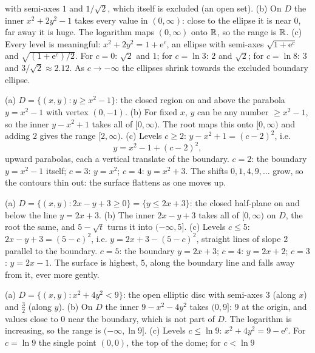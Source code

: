 \begin{solutions}
        with semi-axes $1$ and $1/\sqrt2$, which itself is excluded (an
        open set).
        (b) On $D$ the inner $x^{2}+2y^{2}-1$ takes every value in
        $(0,\infty)$: close to the ellipse it is near $0$, far away it is
        huge. The logarithm maps $(0,\infty)$ onto $\mathbb{R}$, so the range is
        $\mathbb{R}$.
        (c) Every level is meaningful:
        $x^{2}+2y^{2}=1+\mathrm{e}^{c}$, an ellipse with semi-axes
        $\sqrt{1+\mathrm{e}^{c}}$ and $\sqrt{(1+\mathrm{e}^{c})/2}$. For
        $c=0$: $\sqrt2$ and $1$; for $c=\ln3$: $2$ and $\sqrt2$; for
        $c=\ln8$: $3$ and $3/\sqrt2\approx2.12$. As $c\to-\infty$ the
        ellipses shrink towards the excluded boundary ellipse.
  \item (a) $D=\{(x,y):y\ge x^{2}-1\}$: the closed region on and above the
        parabola $y=x^{2}-1$ with vertex $(0,-1)$.
        (b) For fixed $x$, $y$ can be any number $\ge x^{2}-1$, so the inner
        $y-x^{2}+1$ takes all of $[0,\infty)$. The root maps this onto
        $[0,\infty)$ and adding $2$ gives the range $[2,\infty)$.
        (c) Levels $c\ge2$: $y-x^{2}+1=(c-2)^{2}$, i.e.
        \[
          y=x^{2}-1+(c-2)^{2},
        \]
        upward parabolas, each a vertical translate of the boundary. $c=2$:
        the boundary $y=x^{2}-1$ itself; $c=3$: $y=x^{2}$; $c=4$:
        $y=x^{2}+3$. The shifts $0,1,4,9,\ldots$ grow, so the contours thin
        out: the surface flattens as one moves up.
  \item (a) $D=\{(x,y):2x-y+3\ge0\}=\{y\le2x+3\}$: the closed half-plane
        on and below the line $y=2x+3$.
        (b) The inner $2x-y+3$ takes all of $[0,\infty)$ on $D$, the root
        the same, and $5-\sqrt t$ turns it into $(-\infty,5]$.
        (c) Levels $c\le5$: $2x-y+3=(5-c)^{2}$, i.e.
        $y=2x+3-(5-c)^{2}$, straight lines of slope $2$ parallel to the
        boundary. $c=5$: the boundary $y=2x+3$; $c=4$: $y=2x+2$; $c=3$:
        $y=2x-1$. The surface is highest, $5$, along the boundary line and
        falls away from it, ever more gently.
  \item (a) $D=\{(x,y):x^{2}+4y^{2}<9\}$: the open elliptic disc with
        semi-axes $3$ (along $x$) and $\tfrac32$ (along $y$).
        (b) On $D$ the inner $9-x^{2}-4y^{2}$ takes $(0,9]$: $9$ at the
        origin, and values close to $0$ near the boundary, which is not
        part of $D$. The logarithm is increasing, so the range is
        $(-\infty,\ln9]$.
        (c) Levels $c\le\ln9$: $x^{2}+4y^{2}=9-\mathrm{e}^{c}$. For
        $c=\ln9$ the single point $(0,0)$, the top of the dome; for $c<\ln9$

\end{solutions}
